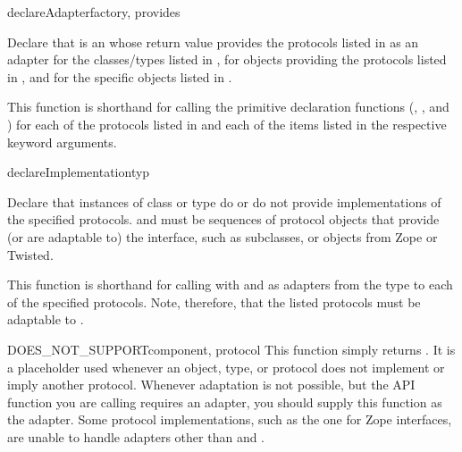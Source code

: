 \begin{verbatim%
}
\begin{verbatim%
}
\begin{verbatim%
}
\begin{verbatim%
}
\begin{verbatim%
}
\begin{verbatim%
}
\begin{funcdesc}{declareAdapter}{factory, provides
 
}

Declare that  is an  whose return value
provides the protocols listed in  as an adapter for the
classes/types listed in , for objects providing the protocols
listed in , and for the specific objects listed in
.

This function is shorthand for calling the primitive declaration
functions (,
, and )
for each of the protocols listed in  and each of the
items listed in the respective keyword arguments.
\end{funcdesc}

\begin{funcdesc}{declareImplementation}{typ
 }

Declare that instances of class or type  do or do not provide
implementations of the specified protocols.   and
 must be sequences of protocol objects that
provide (or are adaptable to) the  interface,
such as  subclasses, or  objects
from Zope or Twisted.

This function is shorthand for calling 
with  and  as adapters
from the type to each of the specified protocols.  Note, therefore, that the
listed protocols must be adaptable to .
\end{funcdesc}


\begin{funcdesc}{DOES_NOT_SUPPORT}{component, protocol}
This function simply returns .  It is a placeholder used whenever
an object, type, or protocol does not implement or imply another protocol.
Whenever adaptation is not possible, but the  API function
you are calling requires an adapter, you should supply this function as the
adapter.  Some protocol implementations, such as the one for Zope interfaces,
are unable to handle adapters other than  and
.
\end{funcdesc}



\end{verbatim%
}
\end{verbatim%
}
\end{verbatim%
}
\end{verbatim%
}
\end{verbatim%
}
\end{verbatim%
}
